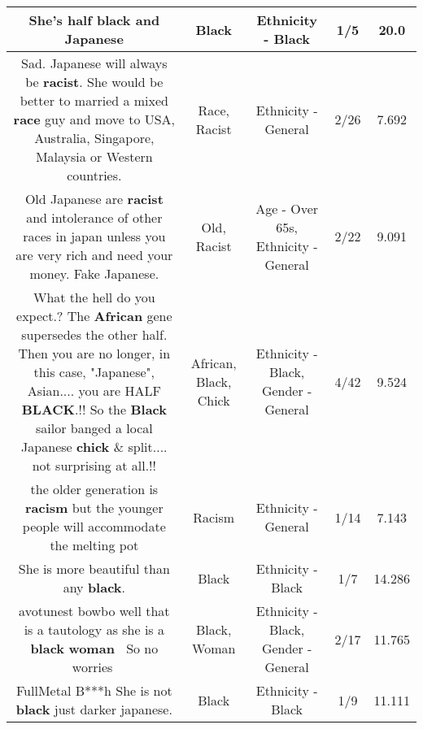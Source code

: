 \documentclass[11pt]{article}
\newlength\mylength
\begin{document}
\begin{center}
\begin{longtable}{|C{.65\mylength}|C{.30\mylength}|C{.12\mylength}|C{.12\mylength}|C{.12\mylength}|}
  \small She's half \textbf{black} and Japanese\normalsize   & Black & Ethnicity - Black & 1/5 & 20.0 \\  \hline
  \small Sad. Japanese will always be \textbf{racist}. She would be better to married a mixed \textbf{race} guy and move to USA, Australia, Singapore,  Malaysia or Western countries.\normalsize   & Race, Racist & Ethnicity - General & 2/26 & 7.692 \\  \hline
  \small Old Japanese are \textbf{racist} and intolerance of other races in japan unless you are very rich and need your money. Fake Japanese.\normalsize   & Old, Racist & Age - Over 65s, Ethnicity - General & 2/22 & 9.091 \\  \hline
  \small What the hell do you expect.? The \textbf{African} gene supersedes the other half. Then you are no longer, in this case, "Japanese", Asian.... you are HALF \textbf{BLACK}.!! So the \textbf{Black} sailor banged a local Japanese \textbf{chick} \& split.... not surprising at all.!!\normalsize   & African, Black, Chick & Ethnicity - Black, Gender - General & 4/42 & 9.524 \\  \hline
  \small the older generation is \textbf{racism} but the younger people will accommodate the melting pot\normalsize   & Racism & Ethnicity - General & 1/14 & 7.143 \\  \hline
  \small She is more beautiful than any \textbf{black}.\normalsize   & Black & Ethnicity - Black & 1/7 & 14.286 \\  \hline
  \small avotunest bowbo well that is a tautology as she is a \textbf{black} \textbf{woman} 🤷‍♀️So no worries🤣\normalsize   & Black, Woman & Ethnicity - Black, Gender - General & 2/17 & 11.765 \\  \hline
  \small FullMetal B***h She is not \textbf{black} just darker japanese.\normalsize   & Black & Ethnicity - Black & 1/9 & 11.111 \\  \hline

\end{longtable}
\end{center}
\end{document}
